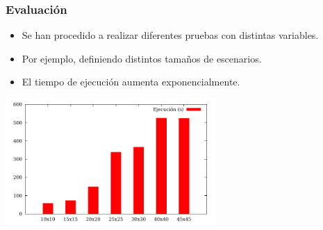 \begin{frame}
\frametitle{Evaluación}

\begin{itemize}
	\item<1-> Se han procedido a realizar diferentes pruebas con distintas variables.
	
	\vspace{1em}
	
	\item<2-> Por ejemplo, definiendo distintos tamaños de escenarios.
	
	\vspace{1em}
	
	\item<3-> El tiempo de ejecución aumenta \textcolor{UDCpink}{exponencialmente}.
\end{itemize}

\vspace{1em}

\pause[3]

\centering
\includegraphics[width=0.6\textwidth]{images/map-size.pdf}

\end{frame}

